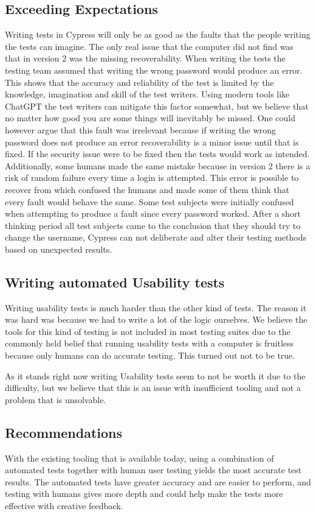 \documentclass[journal,twocolumn]{IEEEtran}
\begin{document}
\subsection{Exceeding Expectations}
Writing tests in Cypress will only be as good as the faults that the people writing the tests can imagine. The only real issue that the computer did not find was that in version 2 was the missing recoverability. When writing the tests the testing team assumed that writing the wrong password would produce an error. This shows that the accuracy and reliability of the test is limited by the knowledge, imagination and skill of the test writers. Using modern tools like ChatGPT the test writers can mitigate this factor somewhat, but we believe that no matter how good you are some things will inevitably be missed. One could however argue that this fault was irrelevant because if writing the wrong password does not produce an error recoverability is a minor issue until that is fixed. If the security issue were to be fixed then the tests would work as intended. Additionally, some humans made the same mistake because in version 2 there is a risk of random failure every time a login is attempted. This error is possible to recover from which confused the humans and made some of them think that every fault would behave the same. Some test subjects were initially confused when attempting to produce a fault since every password worked. After a short thinking period all test subjects came to the conclusion that they should try to change the username, Cypress can not deliberate and alter their testing methods based on unexpected results.

\subsection{Writing automated Usability tests}
Writing usability tests is much harder than the other kind of tests. The reason it was hard was because we had to write a lot of the logic ourselves. We believe the tools for this kind of testing is not included in most testing suites due to the commonly held belief that running usability tests with a computer is fruitless because only humans can do accurate testing. This turned out not to be true.

As it stands right now writing Usability tests seem to not be worth it due to the difficulty, but we believe that this is an issue with insufficient tooling and not a problem that is unsolvable.

\subsection{Recommendations}
With the existing tooling that is available today, using a combination of automated tests together with human user testing yields the most accurate test results. The automated tests have greater accuracy and are easier to perform, and testing with humans gives more depth and could help make the tests more effective with creative feedback.
\end{document}
